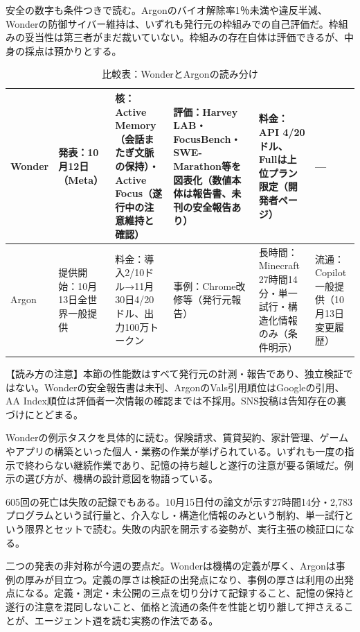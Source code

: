 \documentclass[lualatex,a4paper,10pt]{jlreq}
\begin{document}
安全の数字も条件つきで読む。Argonのバイオ解除率1％未満や違反半減、Wonderの防御サイバー維持は、いずれも発行元の枠組みでの自己評価だ。枠組みの妥当性は第三者がまだ裁いていない。枠組みの存在自体は評価できるが、中身の採点は預かりとする。
\cite{B01,B02,B03,B04,B05,B06,B07,B08}


\begin{table}[htbp]\centering\footnotesize
\caption{比較表：WonderとArgonの読み分け}
\begin{tabularx}{0.96\linewidth}{@{}lXXXXX@{}}
\toprule
Wonder & 発表：10月12日（Meta） & 核：Active Memory（会話またぎ文脈の保持）・Active Focus（遂行中の注意維持と確認） & 評価：Harvey LAB・FocusBench・SWE-Marathon等を図表化（数値本体は報告書、未刊の安全報告あり） & 料金：API 4/20ドル、Fullは上位プラン限定（開発者ページ） & --- \\
\midrule
Argon & 提供開始：10月13日全世界一般提供 & 料金：導入2/10ドル→11月30日4/20ドル、出力100万トークン & 事例：Chrome改修等（発行元報告） & 長時間：Minecraft 27時間14分・単一試行・構造化情報のみ（条件明示） & 流通：Copilot一般提供（10月13日変更履歴） \\
\bottomrule
\end{tabularx}
\end{table}
\cite{B01,B02,B03,B04,B05,B06,B07,B08}


\begin{tcolorbox}[colback=SurveySoft,colframe=SurveyRule,arc=1mm,boxrule=0.4pt,left=2mm,right=2mm]
【読み方の注意】本節の性能数はすべて発行元の計測・報告であり、独立検証ではない。Wonderの安全報告書は未刊、ArgonのVals引用順位はGoogleの引用、AA Index順位は評価者一次情報の確認までは不採用。SNS投稿は告知存在の裏づけにとどまる。
\end{tcolorbox}
\cite{B01,B02,B03,B04,B05,B06,B07,B08}


Wonderの例示タスクを具体的に読む。保険請求、賃貸契約、家計管理、ゲームやアプリの構築といった個人・業務の作業が挙げられている。いずれも一度の指示で終わらない継続作業であり、記憶の持ち越しと遂行の注意が要る領域だ。例示の選び方が、機構の設計意図を物語っている。
\cite{B01,B04,B07}


605回の死亡は失敗の記録でもある。10月15日付の論文が示す27時間14分・2,783プログラムという試行量と、介入なし・構造化情報のみという制約、単一試行という限界とセットで読む。失敗の内訳を開示する姿勢が、実行主張の検証口になる。
\cite{B02,B03,B05,B06,B08}


二つの発表の非対称が今週の要点だ。Wonderは機構の定義が厚く、Argonは事例の厚みが目立つ。定義の厚さは検証の出発点になり、事例の厚さは利用の出発点になる。定義・測定・未公開の三点を切り分けて記録すること、記憶の保持と遂行の注意を混同しないこと、価格と流通の条件を性能と切り離して押さえることが、エージェント週を読む実務の作法である。
\cite{B01,B02,B03,B04,B05,B06,B07,B08}
\end{document}
